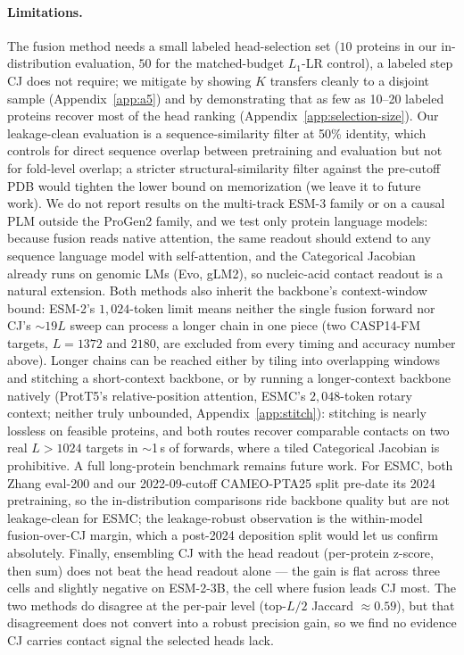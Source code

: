 \documentclass{article}
\begin{document}
\paragraph{Limitations.}
The fusion method needs a small labeled head-selection set ($10$ proteins
in our in-distribution evaluation, $50$ for the matched-budget $L_1$-LR
control), a labeled step CJ does not require; we mitigate by showing $K$ transfers
cleanly to a disjoint sample (Appendix~\ref{app:a5}) and by
demonstrating that as few as 10--20 labeled proteins recover most of
the head ranking (Appendix~\ref{app:selection-size}). Our
leakage-clean evaluation is a sequence-similarity filter at 50\%
identity, which controls for direct sequence overlap between
pretraining and evaluation but not for fold-level overlap; a stricter
structural-similarity filter against the pre-cutoff PDB would
tighten the lower bound on memorization (we leave it to future work).
We do not report results on the multi-track ESM-3 family
\citep{hayes2025esm3} or on a causal PLM outside the ProGen2 family,
and we test only protein language models: because fusion reads native
attention, the same readout should extend to any sequence language model
with self-attention, and the Categorical Jacobian already runs on genomic
LMs (Evo, gLM2), so nucleic-acid contact readout is a natural extension.
Both methods also inherit the backbone's context-window bound: ESM-2's
$1{,}024$-token limit means neither the single fusion forward nor CJ's
$\sim 19L$ sweep can process a longer chain in one piece (two CASP14-FM
targets, $L{=}1372$ and $2180$, are excluded from every timing and
accuracy number above). Longer chains can be reached either by tiling
into overlapping windows and stitching a short-context backbone, or by
running a longer-context backbone natively (ProtT5's relative-position
attention, ESMC's $2{,}048$-token rotary context; neither truly unbounded,
Appendix~\ref{app:stitch}): stitching is nearly lossless on
feasible proteins, and both routes recover comparable contacts on two real
$L{>}1024$ targets in $\sim$1\,s of forwards, where a tiled Categorical
Jacobian is prohibitive. A full long-protein benchmark remains future work.
For ESMC, both Zhang eval-200 and our 2022-09-cutoff CAMEO-PTA25 split
pre-date its 2024 pretraining, so the in-distribution comparisons
ride backbone quality but are not leakage-clean for ESMC; the
leakage-robust observation is the within-model fusion-over-CJ margin,
which a post-2024 deposition split would let us confirm absolutely.
Finally, ensembling CJ with the head readout (per-protein z-score, then
sum) does not beat the head readout alone --- the gain is flat across
three cells and slightly negative on ESM-2-3B, the cell where fusion
leads CJ most. The two methods do disagree at the per-pair level
(top-$L/2$ Jaccard $\approx 0.59$), but that disagreement does not
convert into a robust precision gain, so we find no evidence CJ carries
contact signal the selected heads lack.
\end{document}
